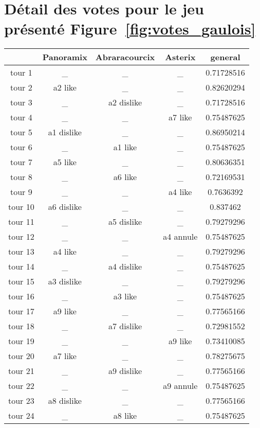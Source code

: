 \documentclass[11pt]{article}
\theoremstyle{defi}
\theoremstyle{not}
\theoremstyle{prob}
\begin{document}
    \section{Détail des votes pour le jeu présenté Figure~\ref{fig:votes_gaulois}}
    \begin{tabular}{|c|c|c|c|c|}
    \hline
    & Panoramix & Abraracourcix & Asterix & general \\
    \hline
    tour 1 & \_ & \_ & \_ & 0.71728516 \\
    \hline
    tour 2 & a2 like & \_ & \_ & 0.82620294 \\
    \hline
    tour 3 & \_ & a2 dislike & \_ & 0.71728516 \\
    \hline
    tour 4 & \_ & \_ & a7 like & 0.75487625 \\
    \hline
    tour 5 & a1 dislike & \_ & \_ & 0.86950214 \\
    \hline
    tour 6 & \_ & a1 like & \_ & 0.75487625 \\
    \hline
    tour 7 & a5 like & \_ & \_ & 0.80636351 \\
    \hline
    tour 8 & \_ & a6 like & \_ & 0.72169531 \\
    \hline
    tour 9 & \_ & \_ & a4 like & 0.7636392 \\
    \hline
    tour 10 & a6 dislike & \_ & \_ & 0.837462 \\
    \hline
    tour 11 & \_ & a5 dislike & \_ & 0.79279296 \\
    \hline
    tour 12 & \_ & \_ & a4 annule & 0.75487625 \\
    \hline
    tour 13 & a4 like & \_ & \_ & 0.79279296 \\
    \hline
    tour 14 & \_ & a4 dislike & \_ & 0.75487625 \\
    \hline
    tour 15 & a3 dislike & \_ & \_ & 0.79279296 \\
    \hline
    tour 16 & \_ & a3 like & \_ & 0.75487625 \\
    \hline
    tour 17 & a9 like & \_ & \_ & 0.77565166 \\
    \hline
    tour 18 & \_ & a7 dislike & \_ & 0.72981552 \\
    \hline
    tour 19 & \_ & \_ & a9 like & 0.73410085 \\
    \hline
    tour 20 & a7 like & \_ & \_ & 0.78275675 \\
    \hline
    tour 21 & \_ & a9 dislike & \_ & 0.77565166 \\
    \hline
    tour 22 & \_ & \_ & a9 annule & 0.75487625 \\
    \hline
    tour 23 & a8 dislike & \_ & \_ & 0.77565166 \\
    \hline
    tour 24 & \_ & a8 like & \_ & 0.75487625 \\
    \hline
    \end{tabular}

\end{document}
